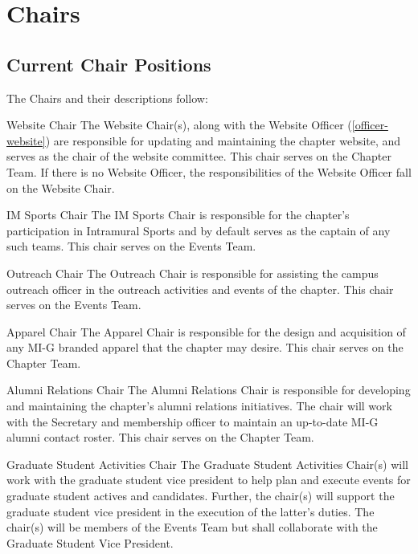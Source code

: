 \chapter{Chairs}\label{sec:Chairs} 
\section{Current Chair Positions} The Chairs and their descriptions follow:\\
\begin{enumsubsection}
\item{Website Chair} The Website Chair(s), along with the Website Officer (\ref{officer-website}) are responsible for updating and maintaining the chapter website, and serves as the chair of the website committee. This chair serves on the Chapter Team.  If there is no Website Officer, the responsibilities of the Website Officer fall on the Website Chair.
\item{IM Sports Chair} The IM Sports Chair is responsible for the chapter's participation in Intramural Sports and by default serves as the captain of any such teams. This chair serves on the Events Team.
\item{Outreach Chair} The Outreach Chair is responsible for assisting the
campus outreach officer in the outreach activities and events of the chapter. This chair serves on the Events Team.
\item{Apparel Chair} The Apparel Chair is responsible for the design and acquisition of any MI-G branded apparel that the chapter may desire. This chair serves on the Chapter Team.
\item{Alumni Relations Chair} The Alumni Relations Chair is responsible for developing and maintaining the chapter's alumni relations initiatives. The chair will work with the Secretary and membership officer to maintain an up-to-date MI-G alumni contact roster. This chair serves on the Chapter Team.
\item{Graduate Student Activities Chair} The Graduate Student Activities Chair(s) will work with the graduate student vice president to help plan and execute events for graduate student actives and candidates. Further, the chair(s) will support the graduate student vice president in the execution of the latter's duties. The chair(s) will be members of the Events Team but shall collaborate with the Graduate Student Vice President.


\end{enumsubsection}
